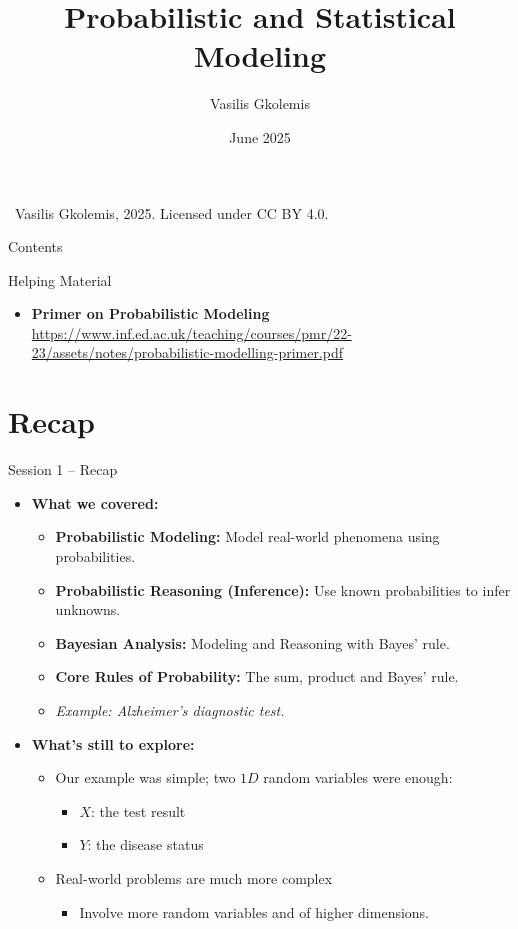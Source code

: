 \documentclass{beamer}
\title{Probabilistic and Statistical Modeling}
\author{Vasilis Gkolemis}
\institute{ATHENA RC | HUA}
\date{June 2025}
\begin{document}
\begin{frame}
  \titlepage
  \vfill
  \footnotesize
  \textcopyright\
  Vasilis Gkolemis, 2025. Licensed under CC BY 4.0.
\end{frame}

\begin{frame}{Contents}
  \tableofcontents
\end{frame}


\begin{frame}{Helping Material}
  \begin{itemize}
    \item \textbf{Primer on Probabilistic Modeling} \url{https://www.inf.ed.ac.uk/teaching/courses/pmr/22-23/assets/notes/probabilistic-modelling-primer.pdf}
  \end{itemize}
\end{frame}


\section{Recap}

\begin{frame}{Session 1 – Recap}
  \begin{itemize}
    \item \textbf{What we covered:}
    \begin{itemize}
      \item \textbf{Probabilistic Modeling:}
      Model real-world phenomena using probabilities.

      \item \textbf{Probabilistic Reasoning (Inference):}
      Use known probabilities to infer unknowns.

      \item \textbf{Bayesian Analysis:}
      Modeling and Reasoning with Bayes’ rule.

      \item \textbf{Core Rules of Probability:}
        The sum, product and Bayes’ rule.

      \item \textit{Example: Alzheimer’s diagnostic test.}
    \end{itemize}

    \item \textbf{What’s still to explore:}
    \begin{itemize}
      \item Our example was simple; two $1D$ random variables were enough:
      \begin{itemize}
        \item $X$: the test result
        \item $Y$: the disease status
      \end{itemize}
    \item Real-world problems are much more complex
      \begin{itemize}
      \item Involve more random variables and of higher dimensions.
      \end{itemize}
    \end{itemize}
  \end{itemize}
\end{frame}
\end{document}
